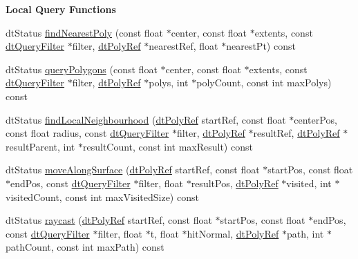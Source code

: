 \begin{Indent}\textbf{ Local Query Functions}\par
\begin{DoxyCompactItemize}
\item 
dt\+Status \hyperlink{classdtNavMeshQuery_aed1dfebde233657db668416ceaee8537}{find\+Nearest\+Poly} (const float $\ast$center, const float $\ast$extents, const \hyperlink{classdtQueryFilter}{dt\+Query\+Filter} $\ast$filter, \hyperlink{group__detour_gab4e0b2257a670c1a800057999612b466}{dt\+Poly\+Ref} $\ast$nearest\+Ref, float $\ast$nearest\+Pt) const
\item 
dt\+Status \hyperlink{classdtNavMeshQuery_ae7eb88f9f77aa29f1c85f8ccf8ad1d49}{query\+Polygons} (const float $\ast$center, const float $\ast$extents, const \hyperlink{classdtQueryFilter}{dt\+Query\+Filter} $\ast$filter, \hyperlink{group__detour_gab4e0b2257a670c1a800057999612b466}{dt\+Poly\+Ref} $\ast$polys, int $\ast$poly\+Count, const int max\+Polys) const
\item 
dt\+Status \hyperlink{classdtNavMeshQuery_a9864032da48ba6f1055deab90633ffd6}{find\+Local\+Neighbourhood} (\hyperlink{group__detour_gab4e0b2257a670c1a800057999612b466}{dt\+Poly\+Ref} start\+Ref, const float $\ast$center\+Pos, const float radius, const \hyperlink{classdtQueryFilter}{dt\+Query\+Filter} $\ast$filter, \hyperlink{group__detour_gab4e0b2257a670c1a800057999612b466}{dt\+Poly\+Ref} $\ast$result\+Ref, \hyperlink{group__detour_gab4e0b2257a670c1a800057999612b466}{dt\+Poly\+Ref} $\ast$result\+Parent, int $\ast$result\+Count, const int max\+Result) const
\item 
dt\+Status \hyperlink{classdtNavMeshQuery_a95f6d7c92a75c7773ababeb144206968}{move\+Along\+Surface} (\hyperlink{group__detour_gab4e0b2257a670c1a800057999612b466}{dt\+Poly\+Ref} start\+Ref, const float $\ast$start\+Pos, const float $\ast$end\+Pos, const \hyperlink{classdtQueryFilter}{dt\+Query\+Filter} $\ast$filter, float $\ast$result\+Pos, \hyperlink{group__detour_gab4e0b2257a670c1a800057999612b466}{dt\+Poly\+Ref} $\ast$visited, int $\ast$visited\+Count, const int max\+Visited\+Size) const
\item 
dt\+Status \hyperlink{classdtNavMeshQuery_a7509a4bf31a215f20478c5050ef25913}{raycast} (\hyperlink{group__detour_gab4e0b2257a670c1a800057999612b466}{dt\+Poly\+Ref} start\+Ref, const float $\ast$start\+Pos, const float $\ast$end\+Pos, const \hyperlink{classdtQueryFilter}{dt\+Query\+Filter} $\ast$filter, float $\ast$t, float $\ast$hit\+Normal, \hyperlink{group__detour_gab4e0b2257a670c1a800057999612b466}{dt\+Poly\+Ref} $\ast$path, int $\ast$path\+Count, const int max\+Path) const

\end{DoxyCompactItemize}
\end{Indent}
